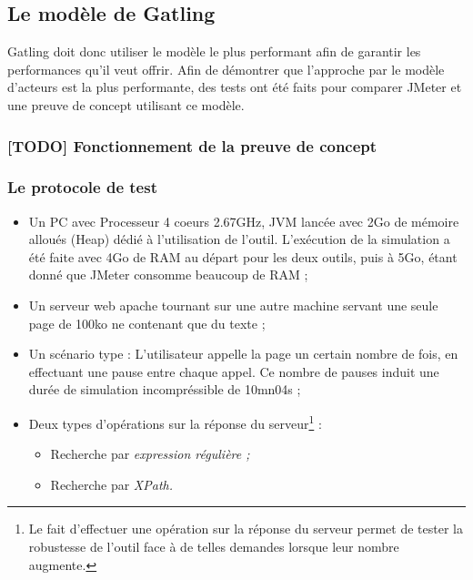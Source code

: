 \subsection{Le modèle de Gatling}
Gatling doit donc utiliser le modèle le plus performant afin de garantir les performances qu'il veut offrir. Afin de démontrer que l'approche par le modèle d'acteurs est la plus performante, des tests ont été faits pour comparer JMeter et une preuve de concept utilisant ce modèle.

\subsubsection{[TODO] Fonctionnement de la preuve de concept}

\subsubsection{Le protocole de test}

\begin{itemize}
  \item Un PC avec Processeur 4 coeurs 2.67GHz, JVM lancée avec 2Go de mémoire alloués (Heap) dédié à l'utilisation de l'outil. L'exécution de la simulation a été faite avec 4Go de RAM au départ pour les deux outils, puis à 5Go, étant donné que JMeter consomme beaucoup de RAM ;
  \item Un serveur web apache tournant sur une autre machine servant une seule page de 100ko ne contenant que du texte ;
  \item Un scénario type : L'utilisateur appelle la page un certain nombre de fois, en effectuant une pause entre chaque appel. Ce nombre de pauses induit une durée de simulation incompréssible de 10mn04s ;
  \item Deux types d'opérations sur la réponse du serveur\footnote{Le fait d'effectuer une opération sur la réponse du serveur permet de tester la robustesse de l'outil face à de telles demandes lorsque leur nombre augmente.} :
  \begin{itemize}
    \item Recherche par \em{expression régulière} ;
    \item Recherche par \em{XPath}.
  \end{itemize}
\end{itemize}

